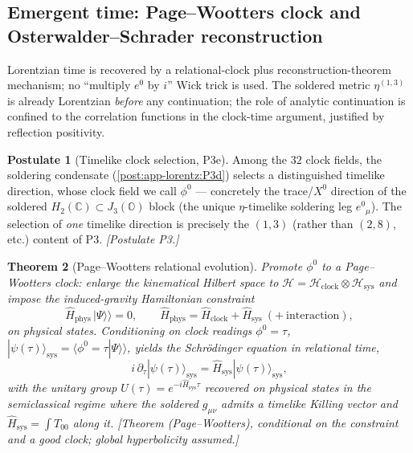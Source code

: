 \documentclass[11pt]{article}
\theoremstyle{plain}
\newtheorem{theorem}{Theorem}[section]
\theoremstyle{definition}
\newtheorem{postulate}[theorem]{Postulate}
\theoremstyle{remark}
\begin{document}
\subsection{Emergent time: Page--Wootters clock and Osterwalder--Schrader reconstruction}
\label{subsec:app-lorentz:time}

Lorentzian time is recovered by a relational-clock plus reconstruction-theorem
mechanism; no ``multiply $e^{0}$ by $i$'' Wick trick is used. The soldered metric
$\eta^{(1,3)}$ is already Lorentzian \emph{before} any continuation; the role of
analytic continuation is confined to the correlation functions in the clock-time
argument, justified by reflection positivity.

\begin{postulate}[Timelike clock selection, P3e]
\label{post:app-lorentz:clock}
Among the $32$ clock fields, the soldering condensate
(\autoref{post:app-lorentz:P3d}) selects a distinguished timelike direction, whose
clock field we call $\phi^{0}$ --- concretely the trace/$X^{0}$ direction of the
soldered $H_{2}(\mathbb{C})\subset J_{3}(\mathbb{O})$ block (the unique
$\eta$-timelike soldering leg $e^{0}{}_{\mu}$). The selection of \emph{one} timelike
direction is precisely the $(1,3)$ (rather than $(2,8)$, etc.) content of P3.
\emph{[Postulate P3.]}
\end{postulate}

\begin{theorem}[Page--Wootters relational evolution]
\label{thm:app-lorentz:PW}
Promote $\phi^{0}$ to a Page--Wootters clock: enlarge the kinematical Hilbert space
to $\mathcal{H}=\mathcal{H}_{\mathrm{clock}}\otimes\mathcal{H}_{\mathrm{sys}}$ and
impose the induced-gravity Hamiltonian constraint
\begin{equation}
\label{eq:app-lorentz:constraint}
\hat{H}_{\mathrm{phys}}\,|\Psi\rangle\!\rangle=0,
\qquad
\hat{H}_{\mathrm{phys}}=\hat{H}_{\mathrm{clock}}+\hat{H}_{\mathrm{sys}}
\ (+\ \text{interaction}),
\end{equation}
on physical states. Conditioning on clock readings $\phi^{0}=\tau$,
$|\psi(\tau)\rangle_{\mathrm{sys}}=\langle\phi^{0}=\tau|\Psi\rangle\!\rangle$, yields
the Schr\"odinger equation in relational time,
\begin{equation}
\label{eq:app-lorentz:schrodinger}
i\,\partial_{\tau}|\psi(\tau)\rangle_{\mathrm{sys}}
 =\hat{H}_{\mathrm{sys}}|\psi(\tau)\rangle_{\mathrm{sys}},
\end{equation}
with the unitary group $U(\tau)=e^{-i\hat{H}_{\mathrm{sys}}\tau}$ recovered on
physical states in the semiclassical regime where the soldered $g_{\mu\nu}$ admits a
timelike Killing vector and $\hat{H}_{\mathrm{sys}}=\int T_{00}$ along it.
\emph{[Theorem (Page--Wootters), conditional on the constraint and a good clock; global hyperbolicity assumed.]}
\end{theorem}
\end{document}
